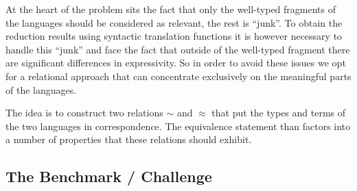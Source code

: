 \documentclass[a4paper,UKenglish]{lipics-v2016}
\newcommand{\tyr}{\mathrel{\sim}}
\newcommand{\tmr}{\mathrel{\approx}}
\begin{document}
At the heart of the problem sits the fact that only the well-typed fragments of the languages should be considered as relevant, the rest is ``junk''.
To obtain the reduction results using syntactic translation functions it is however necessary to handle this ``junk'' and face the fact that outside of the well-typed fragment there are significant differences in expressivity.
So in order to avoid these issues we opt for a relational approach that can concentrate exclusively on the meaningful parts of the languages.

The idea is to construct two relations $\tyr$ and $\tmr$ that put the types and terms of the two languages in correspondence.
The equivalence statement than factors into a number of properties that these relations should exhibit.

\subsection{The Benchmark / Challenge}
\label{sec:benchmark--challenge}
\end{document}
